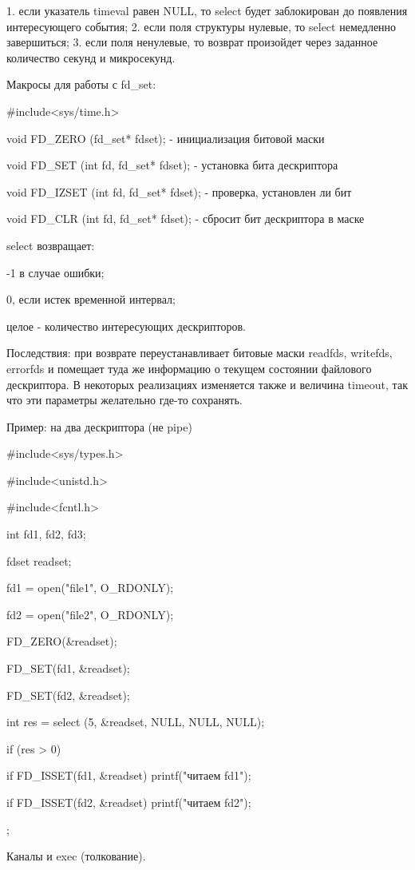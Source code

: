  1. если указатель timeval равен NULL, то select будет заблокирован до
    появления интересующего события;
 2. если поля структуры нулевые, то select немедленно завершиться;
 3. если поля ненулевые, то возврат произойдет через заданное
    количество секунд и микросекунд.

Макросы для работы с fd_set:

#include<sys/time.h>

void FD_ZERO (fd_set* fdset); - инициализация битовой маски

void FD_SET (int fd, fd_set* fdset); - установка бита дескриптора

void FD_IZSET (int fd, fd_set* fdset); - проверка, установлен ли бит

void FD_CLR (int fd, fd_set* fdset); - сбросит бит дескриптора в маске

select возвращает:

-1 в случае ошибки;

0, если истек временной интервал;

целое - количество интересующих дескрипторов.

Последствия: при возврате переустанавливает битовые маски readfds,
writefds, errorfds и помещает туда же информацию о текущем состоянии
файлового дескриптора. В некоторых реализациях изменяется также и
величина timeout, так что эти параметры желательно где-то сохранять.

Пример: на два дескриптора (не pipe)

#include<sys/types.h>

#include<unistd.h>

#include<fcntl.h>

int fd1, fd2, fd3;

fdset readset;

fd1 = open("file1", O_RDONLY);

fd2 = open("file2", O_RDONLY);

FD_ZERO(&readset);

FD_SET(fd1, &readset);

FD_SET(fd2, &readset);

int res = select (5, &readset, NULL, NULL, NULL);

if (res > 0)

{

if FD_ISSET(fd1, &readset) printf("читаем fd1");

if FD_ISSET(fd2, &readset) printf("читаем fd2");

};

                     Каналы и exec (толкование).

